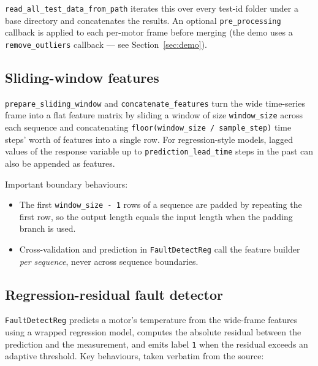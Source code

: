 \documentclass[11pt,a4paper]{article}
\begin{document}
\texttt{read\_all\_test\_data\_from\_path} iterates this over every test-id
folder under a base directory and concatenates the results. An optional
\texttt{pre\_processing} callback is applied to each per-motor frame before
merging (the demo uses a \texttt{remove\_outliers} callback --- see
Section~\ref{sec:demo}).

\subsection{Sliding-window features}

\texttt{prepare\_sliding\_window} and \texttt{concatenate\_features} turn the
wide time-series frame into a flat feature matrix by sliding a window of size
\texttt{window\_size} across each sequence and concatenating
\texttt{floor(window\_size / sample\_step)} time steps' worth of features into
a single row. For regression-style models, lagged values of the response
variable up to \texttt{prediction\_lead\_time} steps in the past can also be
appended as features.

Important boundary behaviours:

\begin{itemize}[leftmargin=1.4em]
  \item The first \texttt{window\_size - 1} rows of a sequence are padded by
        repeating the first row, so the output length equals the input length
        when the padding branch is used.
  \item Cross-validation and prediction in \texttt{FaultDetectReg} call the
        feature builder \emph{per sequence}, never across sequence boundaries.
\end{itemize}

\subsection{Regression-residual fault detector}

\texttt{FaultDetectReg} predicts a motor's temperature from the wide-frame
features using a wrapped regression model, computes the absolute residual
between the prediction and the measurement, and emits label \texttt{1} when
the residual exceeds an adaptive threshold. Key behaviours, taken verbatim
from the source:
\end{document}
